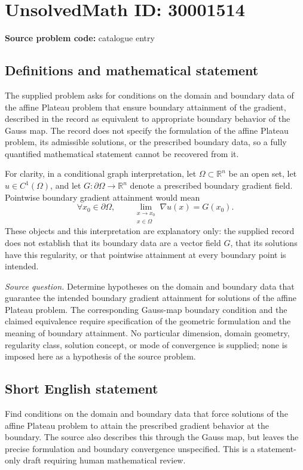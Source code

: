 \documentclass[11pt]{article}
\newcommand{\R}{\mathbb{R}}
\begin{document}
\section*{UnsolvedMath ID: 30001514}
\textbf{Source problem code:} catalogue entry
\subsection{Definitions and mathematical statement}
The supplied problem asks for conditions on the domain and boundary data of the affine Plateau problem that ensure boundary attainment of the gradient, described in the record as equivalent to appropriate boundary behavior of the Gauss map. The record does not specify the formulation of the affine Plateau problem, its admissible solutions, or the prescribed boundary data, so a fully quantified mathematical statement cannot be recovered from it.

For clarity, in a conditional graph interpretation, let \(\Omega\subset\R^n\) be an open set, let \(u\in C^1(\Omega)\), and let \(G:\partial\Omega\to\R^n\) denote a prescribed boundary gradient field. Pointwise boundary gradient attainment would mean
\[
\forall x_0\in\partial\Omega,\qquad
\lim_{\substack{x\to x_0\\x\in\Omega}}\nabla u(x)=G(x_0).
\]
These objects and this interpretation are explanatory only: the supplied record does not establish that its boundary data are a vector field \(G\), that its solutions have this regularity, or that pointwise attainment at every boundary point is intended.

\emph{Source question.} Determine hypotheses on the domain and boundary data that guarantee the intended boundary gradient attainment for solutions of the affine Plateau problem. The corresponding Gauss-map boundary condition and the claimed equivalence require specification of the geometric formulation and the meaning of boundary attainment. No particular dimension, domain geometry, regularity class, solution concept, or mode of convergence is supplied; none is imposed here as a hypothesis of the source problem.
\subsection{Short English statement}
Find conditions on the domain and boundary data that force solutions of the affine Plateau problem to attain the prescribed gradient behavior at the boundary. The source also describes this through the Gauss map, but leaves the precise formulation and boundary convergence unspecified. This is a statement-only draft requiring human mathematical review.
\end{document}
